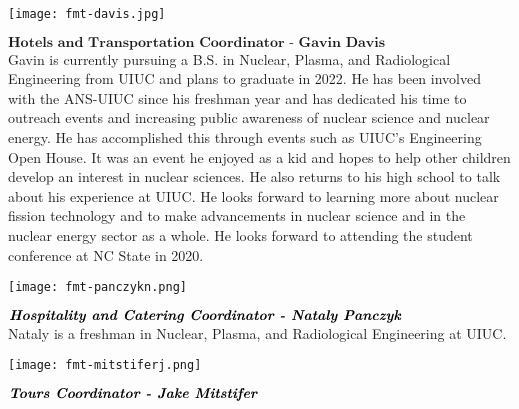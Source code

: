\begin{minipage}{0.25\textwidth}
	\centering
	\texttt{[image: fmt-davis.jpg]}
\end{minipage}
\begin{minipage}{0.73\textwidth}
$\textbf{Hotels and Transportation Coordinator - Gavin Davis}$\\
	Gavin is currently pursuing a B.S. in Nuclear, Plasma, and Radiological Engineering from UIUC and plans to graduate in 2022. He has been involved with the ANS-UIUC since his freshman year and has dedicated his time to outreach events and increasing public awareness of nuclear science and nuclear energy. He has accomplished this through events such as UIUC's Engineering Open House. It was an event he enjoyed as a kid and hopes to help other children develop an interest in nuclear sciences. He also returns to his high school to talk about his experience at UIUC. He looks forward to learning more about nuclear fission technology and to make advancements in nuclear science and in the nuclear energy sector as a whole. He looks forward to attending the student conference at NC State in 2020.
\end{minipage}

\begin{minipage}{0.25\textwidth}
	\centering
	\texttt{[image: fmt-panczykn.png]}
\end{minipage}
\begin{minipage}{0.73\textwidth}
	$\textbf{\textit{Hospitality and Catering Coordinator - Nataly Panczyk}}$\\
	Nataly is a freshman in Nuclear, Plasma, and Radiological Engineering at UIUC.
\end{minipage}

\begin{minipage}{0.25\textwidth}
	\centering
	\texttt{[image: fmt-mitstiferj.png]}
\end{minipage}
\begin{minipage}{0.73\textwidth}
	$\textbf{\textit{Tours Coordinator - Jake Mitstifer}}$\\

\end{minipage}

